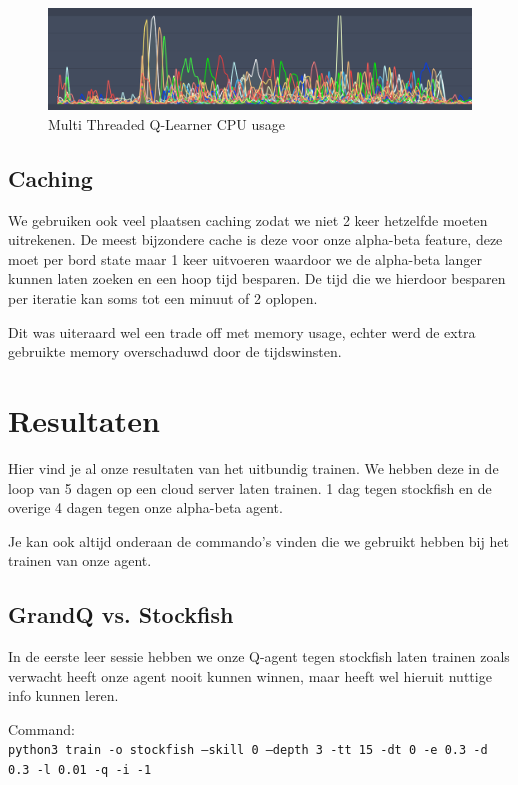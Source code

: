 \documentclass[a4paper,openany]{uantwerpenassignment}
\newcommand{\codeword}[1]{
    \colorbox{code}{\texttt{\textcolor{codetext}{#1}}}
}
\begin{document}
\begin{figure}[h]
    \centering
    \includegraphics[width=350pt]{images/multithreaded.png}
    \caption{Multi Threaded Q-Learner CPU usage}
    \label{fig:multithreaded}
\end{figure}

\section{Caching}
\label{caching}

We gebruiken ook veel plaatsen caching zodat we niet 2 keer hetzelfde moeten uitrekenen. De meest bijzondere cache is deze voor onze alpha-beta feature, deze moet per bord state maar 1 keer uitvoeren waardoor we de alpha-beta langer kunnen laten zoeken en een hoop tijd besparen.
De tijd die we hierdoor besparen per iteratie kan soms tot een minuut of 2 oplopen.

Dit was uiteraard wel een trade off met memory usage, echter werd de extra gebruikte memory overschaduwd door de tijdswinsten.

\chapter{Resultaten}

Hier vind je al onze resultaten van het uitbundig trainen. We hebben deze in de loop van 5 dagen op een cloud server laten trainen. 1 dag tegen stockfish en de overige 4 dagen tegen onze alpha-beta agent.

Je kan ook altijd onderaan de commando's vinden die we gebruikt hebben bij het trainen van onze agent.

\section{GrandQ vs. Stockfish}

In de eerste leer sessie hebben we onze Q-agent tegen stockfish laten trainen zoals verwacht heeft onze agent nooit kunnen winnen, maar heeft wel hieruit nuttige info kunnen leren.

Command:\\
\codeword{python3 train -o stockfish --skill 0 --depth 3 -tt 15 -dt 0 -e 0.3 -d 0.3 -l 0.01 -q -i -1}
\end{document}
